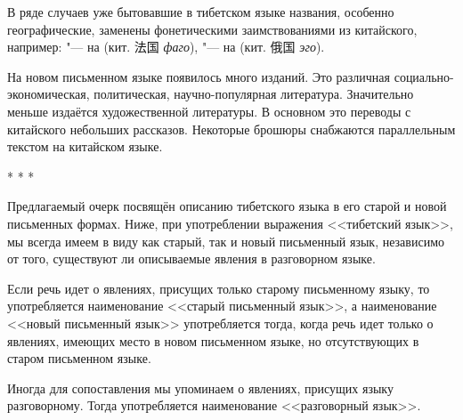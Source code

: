 В ряде случаев уже бытовавшие в тибетском языке названия, особенно географические, заменены фонетическими заимствованиями из китайского, например:  "--- на  (кит. {\chinfont 法国} \textit{фаго}),  "--- на  (кит. {\chinfont 俄国} \textit{эго}).

На новом письменном языке появилось много изданий. Это различная со\-циаль\-но-эко\-но\-ми\-чес\-кая, политическая, научно-популярная литература. Значительно меньше издаётся художественной литературы. В основном это переводы с китайского небольших рассказов. Некоторые брошюры снабжаются параллельным текстом на китайском языке.

\begin{center}
* * *
\end{center}

Предлагаемый очерк посвящён описанию тибетского языка в его старой и новой письменных формах. Ниже, при употреблении выражения <<тибетский язык>>, мы всегда имеем в виду как старый, так и новый письменный язык, независимо от того, существуют ли описываемые явления в разговорном языке.

Если речь идет о явлениях, присущих только старому письменному языку, то употребляется наименование <<старый письменный язык>>, а наименование <<новый письменный язык>> употребляется тогда, когда речь идет только о явлениях, имеющих место в новом письменном языке, но отсутствующих в старом письменном языке.

Иногда для сопоставления мы упоминаем о явлениях, присущих языку разговорному. Тогда употребляется наименование <<разговорный язык>>.

